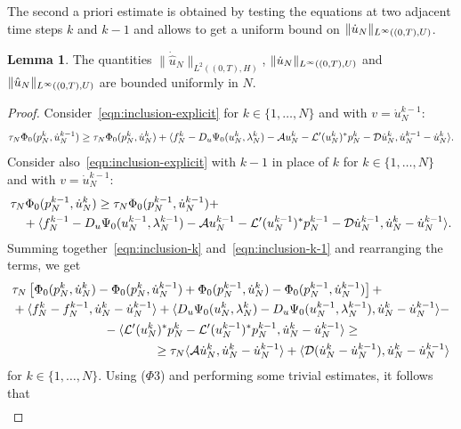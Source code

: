 \documentclass[a4paper,10pt,twoside]{amsbook}
\numberwithin{section}{chapter}
\numberwithin{equation}{chapter}
\theoremstyle{definition}
\newtheorem{lemma}[prop]{Lemma}
\DeclarePairedDelimiter{\norm}{\lVert}{\rVert}
\DeclarePairedDelimiter{\dual}{\langle}{\rangle}
\begin{document}
The second a priori estimate is obtained by testing the equations at two adjacent time steps $k$ and $k-1$ and allows to get a uniform bound on $\norm{\dot u_N}_{L^\infty((0,T),U)}$.
\begin{lemma}
The quantities
$\|\dot{\hat{u}}_N\|_{L^2((0,T),H)}$, $\norm{\dot u_N}_{L^\infty((0,T),U)}$ and $\norm{\hat u_N}_{L^\infty((0,T),U)}$ are bounded uniformly in $N$.
\end{lemma}
\begin{proof}
Consider~\eqref{eqn:inclusion-explicit} for $k\in\{1,\dots,N\}$ and with $v=\dot u_N^{k-1}$:
\begin{equation}
\label{eqn:inclusion-k}
\tau_N\Phi_0(p_N^k,\dot u_N^{k-1})\ge\tau_N\Phi_0(p_N^k,\dot u_N^k)+\dual{f_N^k-D_u\Psi_0(u_N^k,\lambda_N^k)-\mathcal{A}u_N^k-\mathcal{L}'(u_N^k)^*p_N^k-\mathcal{D}\dot u_N^k,\dot u_N^{k-1}-\dot u_N^k}.
\end{equation}
Consider also~\eqref{eqn:inclusion-explicit} with $k-1$ in place of $k$ for $k\in\{1,\dots,N\}$ and with $v=\dot u_N^{k-1}$:
\begin{equation}
\label{eqn:inclusion-k-1}
\begin{multlined}
\tau_N\Phi_0(p_N^{k-1},\dot u_N^k)\ge\tau_N\Phi_0(p_N^{k-1},\dot u_N^{k-1})+\\
+\dual{f_N^{k-1}-D_u\Psi_0(u_N^{k-1},\lambda_N^{k-1})-\mathcal{A}u_N^{k-1}-\mathcal{L}'(u_N^{k-1})^*p_N^{k-1}-\mathcal{D}\dot u_N^{k-1},\dot u_N^k-\dot u_N^{k-1}}.
\end{multlined}
\end{equation}
Summing together~\eqref{eqn:inclusion-k} and~\eqref{eqn:inclusion-k-1} and rearranging the terms, we get
\[
\begin{multlined}
\tau_N\left[\Phi_0(p_N^k,\dot u_N^k)-\Phi_0(p_N^k,\dot u_N^{k-1})+\Phi_0(p_N^{k-1},\dot u_N^k)-\Phi_0(p_N^{k-1},\dot u_N^{k-1})\right]+\\
+\dual{f_N^k-f_N^{k-1},\dot u_N^k-\dot u_N^{k-1}}+\dual{D_u\Psi_0(u_N^k,\lambda_N^k)-D_u\Psi_0(u_N^{k-1},\lambda_N^{k-1}),\dot u_N^k-\dot u_N^{k-1}}-\\
-\dual{\mathcal{L}'(u_N^k)^*p_N^k-\mathcal{L}'(u_N^{k-1})^*p_N^{k-1},\dot u_N^k-\dot u_N^{k-1}}\ge\\
\ge\tau_N\dual{\mathcal{A}\dot u_N^k,\dot u_N^k-\dot u_N^{k-1}}+\dual{\mathcal{D}(\dot u_N^k-\dot u_N^{k-1}),\dot u_N^k-\dot u_N^{k-1}}
\end{multlined}
\]
for $k\in\{1,\dots,N\}$. Using ($\Phi$3) and performing some trivial estimates, it follows that
\[
\begin{multlined}

\end{multlined}\]
\end{proof}
\end{document}
